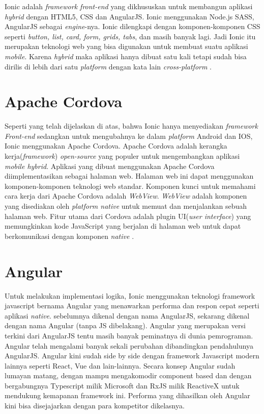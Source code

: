 Ionic adalah \textit{framework front-end} yang dikhususkan untuk membangun aplikasi \textit{hybrid} dengan HTML5, CSS dan AngularJS. Ionic menggunakan Node.js SASS, AngularJS sebagai \textit{engine}-nya. Ionic dilengkapi dengan komponen-komponen CSS seperti \textit{button, list, card, form, grids, tabs}, dan masih banyak lagi. Jadi Ionic itu merupakan teknologi web yang bisa digunakan untuk membuat suatu aplikasi \textit{mobile}. Karena \textit{hybrid} maka aplikasi hanya dibuat satu kali tetapi sudah bisa dirilis di lebih dari satu \textit{platform} dengan kata lain \textit{cross-platform} \citep{Ionic}.


\section{Apache Cordova}
\par Seperti yang telah dijelaskan di atas, bahwa Ionic hanya menyediakan \textit{framework Front-end} sedangkan untuk mengubahnya ke dalam \textit{platform} Android dan IOS, Ionic menggunakan Apache Cordova. Apache Cordova adalah kerangka kerja(\textit{framework}) \textit{open-source} yang populer untuk mengembangkan aplikasi \textit{mobile hybrid}. Aplikasi yang dibuat menggunakan Apache Cordova diimplementasikan sebagai halaman web. Halaman web ini dapat menggunakan komponen-komponen teknologi web standar. Komponen kunci untuk memahami cara kerja dari Apache Cordova adalah \textit{WebView}. \textit{WebView} adalah komponen yang disediakan oleh \textit{platform native} untuk memuat dan menjalankan sebuah halaman web. Fitur utama dari Cordova adalah plugin UI(\textit{user interface}) yang memungkinkan kode JavaScript yang berjalan di halaman web untuk dapat berkomunikasi dengan komponen \textit{native} \citep{cheng2017build}.



\section{Angular}
\par Untuk melakukan implementasi logika, Ionic menggunakan teknologi framework javascript bernama Angular yang menawarkan performa dan respon cepat seperti aplikasi \textit{native}. sebelumnya dikenal dengan nama AngularJS, sekarang dikenal dengan nama Angular (tanpa JS dibelakang). Angular yang merupakan versi terkini dari AngularJS tentu masih banyak peminatnya di dunia pemrograman. Angular telah mengalami banyak sekali perubahan dibandingkan pendahulunya AngularJS. Angular kini sudah side by side dengan framework Javascript modern lainnya seperti React, Vue dan lain-lainnya. Secara konsep Angular sudah lumayan matang, dengan mampu mengakomodir component based dan dengan bergabungnya Typescript milik Microsoft dan RxJS milik ReactiveX untuk mendukung kemapanan framework ini. Performa yang dihasilkan oleh Angular kini bisa disejajarkan dengan para kompetitor dikelasnya.


